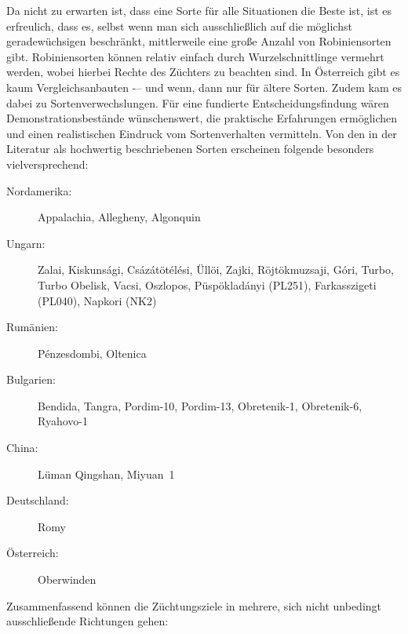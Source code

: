 \documentclass[twocolumn]{scrartcl}
\begin{document}
Da nicht zu erwarten ist, dass eine Sorte für alle Situationen die
Beste ist, ist es erfreulich, dass es, selbst wenn man sich
ausschließlich auf die möglichst geradewüchsigen beschränkt, mittlerweile eine
große Anzahl von Robiniensorten gibt. Robiniensorten können relativ
einfach durch Wurzelschnittlinge vermehrt werden, wobei hierbei Rechte
des Züchters zu beachten sind.
In Österreich gibt es kaum Vergleichsanbauten -– und wenn, dann nur für ältere Sorten.
Zudem kam es dabei zu Sortenverwechslungen.
Für eine fundierte Entscheidungsfindung wären Demonstrationsbestände wünschenswert,
die praktische Erfahrungen ermöglichen und einen realistischen Eindruck vom Sortenverhalten vermitteln.
Von den in der Literatur als hochwertig beschriebenen Sorten erscheinen folgende besonders vielversprechend:

\begin{description}
  \item[Nordamerika:] Appalachia, Allegheny, Algonquin
  \item[Ungarn:] Zalai, Kiskunsági, Csázátötélési, Üllöi, Zajki, Röjtökmuzsaji, Góri, Turbo, Turbo Obelisk, Vacsi, Oszlopos, Püspökladányi (PL251), Farkasszigeti (PL040), Napkori (NK2)
  \item[Rumänien:] Pénzesdombi, Oltenica
  \item[Bulgarien:] Bendida, Tangra, Pordim-10, Pordim-13, Obretenik-1, Obretenik-6, Ryahovo-1
  \item[China:] Lüman Qingshan, Miyuan~1
  \item[Deutschland:] Romy
  \item[Österreich:] Oberwinden
\end{description}

Zusammenfassend können die Züchtungsziele in mehrere, sich nicht unbedingt
ausschließende Richtungen gehen:
\end{document}
